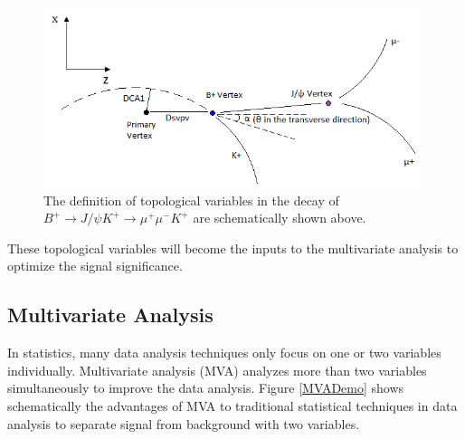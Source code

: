 \begin{figure}[h]
\begin{center}
\includegraphics[width= 0.98\textwidth]{Figures/Chapter5/BPDecay.png}
\caption{The definition of topological variables in the decay of $B^+ \rightarrow J/\psi K^+ \rightarrow \mu^+\mu^- K^+ $ are schematically shown above.}
\label{DecayTopoBP}
\end{center}
\end{figure}

These topological variables will become the inputs to the multivariate analysis to optimize the signal significance.

\subsection{Multivariate Analysis}

In statistics, many data analysis techniques only focus on one or two variables individually. Multivariate analysis (MVA) analyzes more than two variables simultaneously to improve the data analysis. Figure \ref{MVADemo} shows schematically the advantages of MVA to traditional statistical techniques in data analysis to separate signal from background with two variables. 




